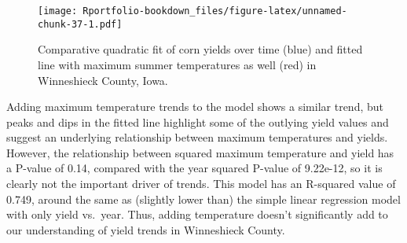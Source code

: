 \documentclass[
]{book}
\newenvironment{Shaded}{\begin{snugshade}}{\end{snugshade}}
\newcommand{\AttributeTok}[1]{\textcolor[rgb]{0.77,0.63,0.00}{#1}}
\newcommand{\FunctionTok}[1]{\textcolor[rgb]{0.00,0.00,0.00}{#1}}
\newcommand{\NormalTok}[1]{#1}
\newcommand{\OtherTok}[1]{\textcolor[rgb]{0.56,0.35,0.01}{#1}}
\newcommand{\SpecialCharTok}[1]{\textcolor[rgb]{0.00,0.00,0.00}{#1}}
\newcommand{\StringTok}[1]{\textcolor[rgb]{0.31,0.60,0.02}{#1}}
\begin{document}
\begin{Shaded}
\end{Shaded}

\begin{figure}
\centering
\texttt{[image: Rportfolio-bookdown\_files/figure-latex/unnamed-chunk-37-1.pdf]}
\caption{\label{fig:unnamed-chunk-37}Comparative quadratic fit of corn yields over time (blue) and fitted line with maximum summer temperatures as well (red) in Winneshieck County, Iowa.}
\end{figure}

Adding maximum temperature trends to the model shows a similar trend, but peaks and dips in the fitted line highlight some of the outlying yield values and suggest an underlying relationship between maximum temperatures and yields. However, the relationship between squared maximum temperature and yield has a P-value of 0.14, compared with the year squared P-value of 9.22e-12, so it is clearly not the important driver of trends. This model has an R-squared value of 0.749, around the same as (slightly lower than) the simple linear regression model with only yield vs.~year. Thus, adding temperature doesn't significantly add to our understanding of yield trends in Winneshieck County.
\end{document}
